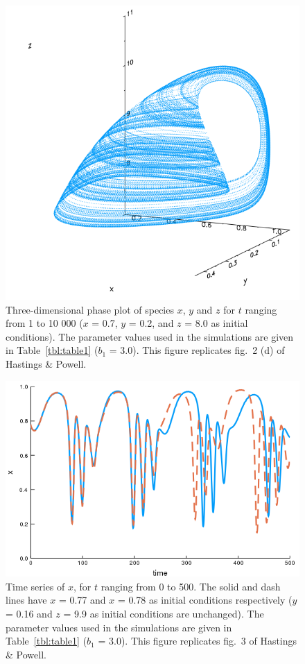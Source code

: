 \documentclass[
]{article}
\begin{document}
\begin{figure}
\hypertarget{fig:fig2d}{%
\centering
\includegraphics{figures/fig2d.png}
\caption{Three-dimensional phase plot of species \(x\), \(y\) and \(z\)
for \(t\) ranging from 1 to 10 000 (\(x\) = 0.7, \(y\) = 0.2, and \(z\)
= 8.0 as initial conditions). The parameter values used in the
simulations are given in Table~\ref{tbl:table1} (\(b_1\) = 3.0). This
figure replicates fig.~2 (d) of Hastings \& Powell.}\label{fig:fig2d}
}
\end{figure}

\begin{figure}
\hypertarget{fig:fig3}{%
\centering
\includegraphics{figures/fig3.png}
\caption{Time series of \(x\), for \(t\) ranging from 0 to 500. The
solid and dash lines have \(x\) = 0.77 and \(x\) = 0.78 as initial
conditions respectively (\(y\) = 0.16 and \(z\) = 9.9 as initial
conditions are unchanged). The parameter values used in the simulations
are given in Table~\ref{tbl:table1} (\(b_1\) = 3.0). This figure
replicates fig.~3 of Hastings \& Powell.}\label{fig:fig3}
}
\end{figure}
\end{document}
